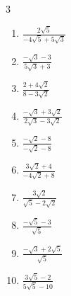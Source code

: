 


\setcounter{quesnum}{15}

\begin{multicols}{3}
\begin{enumerate}
  \itemsep=80pt
  \item $\displaystyle \frac{2\sqrt{5}}{-4\sqrt{5}+5\sqrt{3}}$


  \item $\displaystyle \frac{-\sqrt{3}-3}{5\sqrt{3}+3}$


  \item $\displaystyle \frac{2+4\sqrt{2}}{8-3\sqrt{2}}$


  \item $\displaystyle \frac{-\sqrt{3}+3\sqrt{2}}{2\sqrt{3}-3\sqrt{2}}$


  \item $\displaystyle \frac{-\sqrt{2}-8}{-\sqrt{2}-8}$

        \phantom{$\displaystyle =1$}

\columnbreak %

  \item $\displaystyle \frac{3\sqrt{2}+4}{-4\sqrt{2}+8}$


  \item $\displaystyle \frac{3\sqrt{2}}{\sqrt{5}-2\sqrt{2}}$


  \item $\displaystyle \frac{-\sqrt{5}-3}{\sqrt{5}}$


  \item $\displaystyle \frac{-\sqrt{3}+2\sqrt{5}}{\sqrt{5}}$


  \item $\displaystyle \frac{3\sqrt{5}-2}{5\sqrt{5}-10}$


\end{enumerate}
\end{multicols}
